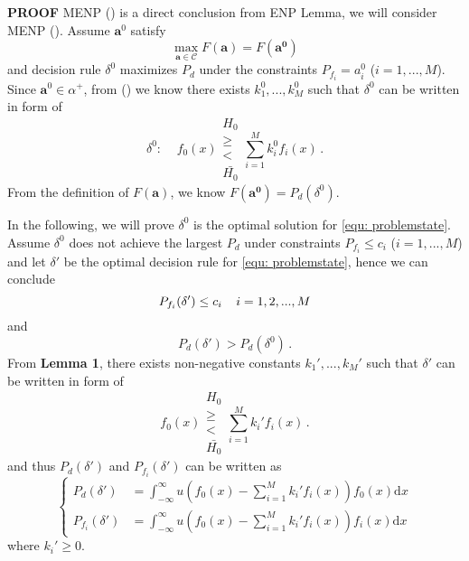 \textbf{PROOF}
MENP () is a direct conclusion from ENP Lemma, we will consider MENP (). Assume $\mathbf{a}^0$ satisfy
\begin{equation}
\label{a0}
\max_{\mathbf{a}\in\mathcal{C}} F(\mathbf{a}) = F(\mathbf{a^0})
\end{equation}
and decision rule $\delta^0$ maximizes $P_d$ under the constraints $P_{f_i} = a^0_i$ ($i = 1, ..., M$). Since $\mathbf{a}^0 \in \alpha^+$, from () we know there exists $k_1^0, ..., k_M^0$ such that $\delta^0$ can be written in form of 
\[
\delta^0:\;\;\;\;f_0(x) \substack{H_0 \\ \geq \\ < \\ \bar{H_0}} \sum_{i=1}^{M}k_i^0f_i(x)\,.
\] 
From the definition of $F(\mathbf{a})$, we know $F(\mathbf{a^0}) = P_d(\delta^0)$.

In the following, we  will prove $\delta^0$ is the optimal solution for \eqref{equ: problemstate}. 
Assume  $\delta^0$ does not achieve the largest $P_d$ under constraints $P_{f_i} \leq c_i$ ($i=1, ..., M$) and let $\delta'$ be the optimal decision rule for \eqref{equ: problemstate}, hence  we can conclude
\begin{equation}
\label{condition 1}
P_{f_i}(\delta') \leq c_i\;\;\;\;i=1, 2, ..., M\\
\end{equation}
and
\begin{equation}
\label{condition 2}
P_{d}(\delta') > P_d(\delta^0)\,.
\end{equation}
From \textbf{Lemma 1}, there exists non-negative constants $k_1', ..., k_M'$ such that $\delta'$ can be written in form of 
\begin{equation}
f_0(x) \substack{H_0 \\ \geq \\ < \\ \bar{H_0}} \sum_{i=1}^{M}k_i'f_i(x)\,.
\end{equation}
and thus $P_d(\delta')$ and $P_{f_i}(\delta')$ can be written as
\begin{equation}
\begin{cases}
\label{TEMP10}
P_{d}(\delta') &= \int_{-\infty}^{\infty} u(f_0(x) - \sum_{i=1}^{M}k_i'f_i(x)) f_0(x) \mathrm{d}x\\
P_{f_i}(\delta') &= \int_{-\infty}^{\infty} u(f_0(x) - \sum_{i=1}^{M}k_i'f_i(x)) f_i(x) \mathrm{d}x
\end{cases}
\end{equation}
where $k_i' \geq 0$.

